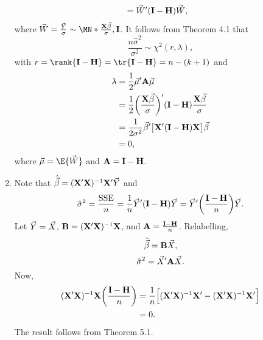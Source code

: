 \begin{Theorem}{}{}
\begin{enumerate}[(1)]
\begin{align*}
                   & =\vec{W}'(\mathbf{I}-\mathbf{H})\vec{W},
              \end{align*}
              where $ \Vector{W}=\frac{\Vector{Y}}{\sigma}\sim \MN*{\frac{\Matrix{X}\Vector{\beta}}{\sigma},\Matrix{I}} $.
              It follows from Theorem 4.1 that
              \[ \frac{n\hat{\sigma}^2}{\sigma^2}\sim \chi^2(r,\lambda), \]
              with $ r=\rank{\Matrix{I}-\Matrix{H}}=\tr{\Matrix{I}-\Matrix{H}}=n-(k+1) $ and
              \begin{align*}
                  \lambda
                   & =\frac{1}{2}\vec{\mu}'\mathbf{A}\vec{\mu}                                                                                  \\
                   & =\frac{1}{2}\biggl(\frac{\mathbf{X}\vec{\beta}}{\sigma}\biggr)'(\mathbf{I}-\mathbf{H})\frac{\mathbf{X}\vec{\beta}}{\sigma} \\
                   & =\frac{1}{2\sigma^2}\vec{\beta}'\bigl[\mathbf{X}'(\mathbf{I}-\mathbf{H})\mathbf{X}\bigr]\vec{\beta}                        \\
                   & =0,
              \end{align*}
              where $ \Vector{\mu}=\E{\Vector{W}} $ and $ \mathbf{A}=\mathbf{I}-\mathbf{H} $.
        \item Note that $ \hat{\vec{\beta}}=(\mathbf{X}'\mathbf{X})^{-1}\mathbf{X}'\vec{Y} $ and
              \[ \hat{\sigma}^2=\frac{\text{SSE}}{n}=\frac{1}{n}\vec{Y}'(\mathbf{I}-\mathbf{H})\vec{Y}=\vec{Y}'\biggl(\frac{\mathbf{I}-\mathbf{H}}{n}\biggr)\vec{Y}. \]
              Let $ \vec{Y}=\vec{X} $, $ \mathbf{B}=(\mathbf{X}'\mathbf{X})^{-1}\mathbf{X} $, and
              $ \mathbf{A}=\frac{\mathbf{I}-\mathbf{H}}{n} $. Relabelling,
              \[ \hat{\vec{\beta}}=\mathbf{B}\vec{X}, \]
              \[ \hat{\sigma}^2=\vec{X}'\mathbf{A}\vec{X}. \]
              Now,
              \begin{align*}
                  (\mathbf{X}'\mathbf{X})^{-1}\mathbf{X}\biggl(\frac{\mathbf{I}-\mathbf{H}}{n}\biggr)
                   & =\frac{1}{n}\Bigl[(\mathbf{X}'\mathbf{X})^{-1}\mathbf{X}'-(\mathbf{X}'\mathbf{X})^{-1}\mathbf{X}'\Bigr] \\
                   & =0.
              \end{align*}
              The result follows from Theorem 5.1.
    \end{enumerate}
\end{Theorem}